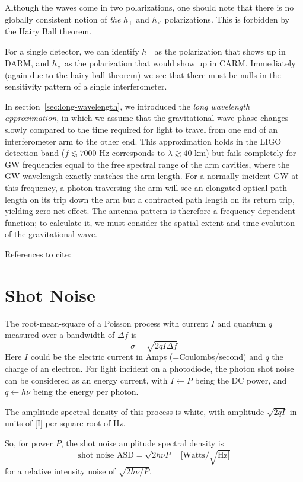Although the waves come in two polarizations, one should note that
there is no globally consistent notion of \emph{the} $h_+$ and
$h_\times$ polarizations.  This is forbidden by the Hairy Ball
theorem.  

For a single detector, we can identify $h_+$ as the polarization
that shows up in DARM, and $h_\times$ as the polarization that would
show up in CARM.  Immediately (again due to the hairy ball theorem) we
see that there must be nulls in the sensitivity pattern of a single
interferometer.

In section~\ref{sec:long-wavelength}, we introduced the \emph{long
  wavelength approximation}, in which we assume that the gravitational
wave phase changes slowly compared to the time required for light to
travel from one end of an interferometer arm to the other end.  This
approximation holds in the LIGO detection band ($f \lesssim 7000$ Hz
corresponds to $\lambda \gtrsim 40$ km) but fails completely for GW
frequencies equal to the free spectral range of the arm cavities,
where the GW wavelength exactly matches the arm length.  For a
normally incident GW at this frequency, a photon traversing the arm
will see an elongated optical path length on its trip down the arm but
a contracted path length on its return trip, yielding zero net effect.
The antenna pattern is therefore a frequency-dependent function; to
calculate it, we must consider the spatial extent and time evolution
of the gravitational wave.

References to cite: \cite{Giampanis2008Search,Schilling1997Angular,Rakhmanov2008Highfrequency,Butler2004Characterization,Fricke2007HighFrequency}

\section{Shot Noise}
The root-mean-square of a Poisson process with current $I$ and quantum
$q$ measured over a bandwidth of $\Delta f$ is 
$$\sigma = \sqrt{2 q I \Delta f}$$ 
Here $I$ could be the electric current in Amps (=Coulombs/second) and
$q$ the charge of an electron.  For light incident on a photodiode,
the photon shot noise can be considered as an energy current, with
$I\leftarrow P$ being the DC power, and $q\leftarrow h\nu$ being the
energy per photon.

The amplitude spectral density of this process is white, with
amplitude $\sqrt{2qI}$ in units of [I] per square root of Hz.

So, for power $P$, the shot noise amplitude spectral density is 
\begin{equation}
\text{shot noise ASD} = \sqrt{2 h\nu P}\quad [\text{Watts}/\sqrt{\text{Hz}]}
\label{eq:shotnoise-asd}
\end{equation}
for a relative intensity noise of $\sqrt{2 h\nu/P}$.

